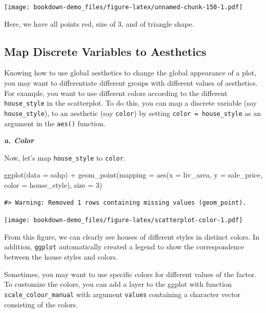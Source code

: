 \documentclass[
]{book}
\newenvironment{Shaded}{\begin{snugshade}}{\end{snugshade}}
\newcommand{\AttributeTok}[1]{\textcolor[rgb]{0.77,0.63,0.00}{#1}}
\newcommand{\DecValTok}[1]{\textcolor[rgb]{0.00,0.00,0.81}{#1}}
\newcommand{\FunctionTok}[1]{\textcolor[rgb]{0.00,0.00,0.00}{#1}}
\newcommand{\NormalTok}[1]{#1}
\newcommand{\SpecialCharTok}[1]{\textcolor[rgb]{0.00,0.00,0.00}{#1}}
\begin{document}
\texttt{[image: bookdown-demo\_files/figure-latex/unnamed-chunk-150-1.pdf]}

Here, we have all points red, size of 3, and of triangle shape.

\hypertarget{map-discrete-aes}{%
\subsection{Map Discrete Variables to Aesthetics}\label{map-discrete-aes}}

Knowing how to use global aesthetics to change the global appearance of a plot, you may want to differentiate different groups with different values of aesthetics. For example, you want to use different colors according to the different \texttt{house\_style} in the scatterplot. To do this, you can map a discrete variable (say \texttt{house\_style}), to an aesthetic (say \texttt{color}) by setting \texttt{color\ =\ house\_style} as an argument in the \texttt{aes()} function.

\textbf{\emph{a. Color}}

Now, let's map \texttt{house\_style} to \texttt{color}.

\begin{Shaded}
\begin{Highlighting}[]
\FunctionTok{ggplot}\NormalTok{(}\AttributeTok{data =}\NormalTok{ sahp) }\SpecialCharTok{+} \FunctionTok{geom\_point}\NormalTok{(}\AttributeTok{mapping =} \FunctionTok{aes}\NormalTok{(}\AttributeTok{x =}\NormalTok{ liv\_area, }\AttributeTok{y =}\NormalTok{ sale\_price, }\AttributeTok{color =}\NormalTok{ house\_style), }\AttributeTok{size =} \DecValTok{3}\NormalTok{)}
\end{Highlighting}
\end{Shaded}

\begin{verbatim}
#> Warning: Removed 1 rows containing missing values (geom_point).
\end{verbatim}

\texttt{[image: bookdown-demo\_files/figure-latex/scatterplot-color-1.pdf]}

From this figure, we can clearly see houses of different styles in distinct colors. In addition, \texttt{ggplot} automatically created a legend to show the correspondence between the house styles and colors.

Sometimes, you may want to use specific colors for different values of the factor. To customize the colors, you can add a layer to the ggplot with function \texttt{scale\_colour\_manual} with argument \texttt{values} containing a character vector consisting of the colors.
\end{document}
